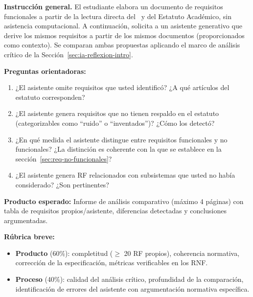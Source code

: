 \begin{tcolorbox}[actividadIA,
  title={Actividad de reflexión (Sprint~2) —
         Software generativo y levantamiento de requisitos}]

\textbf{Instrucción general.}
El estudiante elabora un documento de requisitos funcionales a partir
de la lectura directa del \acuerdo\ y del Estatuto Académico, sin
asistencia computacional. A continuación, solicita a un asistente
generativo que derive los mismos requisitos a partir de los mismos
documentos (proporcionados como contexto). Se comparan ambas propuestas
aplicando el marco de análisis crítico de la Sección~\ref{sec:ia-reflexion-intro}.

\bigskip
\textbf{Preguntas orientadoras:}
\begin{enumerate}[label=\arabic*.]
  \item ¿El asistente omite requisitos que usted identificó? ¿A qué
        artículos del estatuto corresponden?
  \item ¿El asistente genera requisitos que no tienen respaldo en el
        estatuto (categorizables como ``ruido'' o ``inventados'')? ¿Cómo
        los detectó?
  \item ¿En qué medida el asistente distingue entre requisitos funcionales
        y no funcionales? ¿La distinción es coherente con la que se
        establece en la sección~\ref{sec:req-no-funcionales}?
  \item ¿El asistente genera RF relacionados con subsistemas que usted
        no había considerado? ¿Son pertinentes?
\end{enumerate}

\bigskip
\textbf{Producto esperado:} Informe de análisis comparativo (máximo
4 páginas) con tabla de requisitos propios/asistente, diferencias
detectadas y conclusiones argumentadas.

\bigskip
\textbf{Rúbrica breve:}
\begin{itemize}
  \item \textbf{Producto} (60\%): completitud ($\geq$ 20 RF propios),
        coherencia normativa, corrección de la especificación, métricas
        verificables en los RNF.
  \item \textbf{Proceso} (40\%): calidad del análisis crítico,
        profundidad de la comparación, identificación de errores del
        asistente con argumentación normativa específica.
\end{itemize}

\end{tcolorbox}

